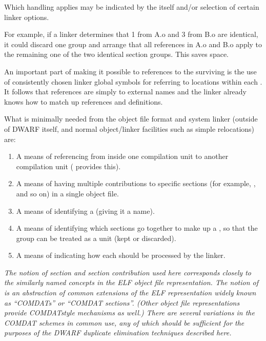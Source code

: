 Which handling applies may be indicated by the 
itself and/or selection of certain linker options.

For example, if a linker determines that 
 1
from A.o and 
 3 from B.o are identical, it could
discard one group and arrange that all references in A.o and
B.o apply to the remaining one of the two identical section
groups. This saves space.

An important part of making it possible to 
references to the surviving 
 is the use of
consistently chosen linker global symbols for referring to
locations within each 
.
It follows that references
are simply to external names and the linker already knows
how to match up references and definitions.

What is minimally needed from the object file format and system
linker (outside of DWARF itself, and normal object/linker
facilities such as simple relocations) are:
\begin{enumerate}[1. ]

\item A means of referencing from inside one \dotdebuginfo{}
compilation unit to another 
\dotdebuginfo{} compilation unit
( provides this).

\item A means of having multiple contributions to specific sections
(for example, \dotdebuginfo{}, and so on) in a single object file.

\item  A means of identifying a  (giving it a name).

\item A means of identifying which sections go together to make
up a , 
so that the group can be treated as a unit
(kept or discarded).

\item  A means of indicating how each  should be
processed by the linker.

\end{enumerate}

\textit{The notion of section and section contribution used here
corresponds closely to the similarly named concepts in the
ELF object file representation. 
The notion of  is
an abstraction of common extensions of the ELF representation
widely known as ``COMDATs'' or ``COMDAT sections''. (Other
object file representations provide COMDAT\dash style mechanisms as
well.) There are several variations in the COMDAT schemes in
common use, any of which should be sufficient for the purposes
of the 
DWARF duplicate elimination techniques described here.}

